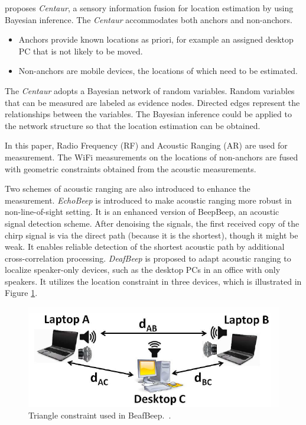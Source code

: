 \documentclass[letterpaper]{article}
\begin{document}
\cite{Nandakumar:2012:CLD:2348543.2348579} proposes \emph{Centaur}, a sensory information fusion for location estimation by using Bayesian inference.
The \emph{Centaur} accommodates both anchors and non-anchors.
\begin{itemize}
\item Anchors provide known locations as priori, for example an assigned desktop PC that is not likely to be moved.
\item Non-anchors are mobile devices, the locations of which need to be estimated.
\end{itemize}

The \emph{Centaur} adopts a Bayesian network of random variables.
Random variables that can be measured are labeled as evidence nodes.
Directed edges represent the relationships between the variables.
The Bayesian inference could be applied to the network structure so that the location estimation can be obtained.

In this paper, Radio Frequency (RF) and Acoustic Ranging (AR) are used for measurement.
The WiFi measurements on the locations of non-anchors are fused with geometric constraints obtained from the acoustic measurements.

Two schemes of acoustic ranging are also introduced to enhance the measurement.
\emph{EchoBeep} is introduced to make acoustic ranging more robust in non-line-of-sight setting.
It is an enhanced version of BeepBeep, an acoustic signal detection scheme.
After denoising the signals, the first received copy of the chirp signal is via the direct path (because it is the shortest), though it might be weak.
It enables reliable detection of the shortest acoustic path by additional cross-correlation processing.
\emph{DeafBeep} is proposed to adapt acoustic ranging to localize speaker-only devices, such as the desktop PCs in an office with only speakers.
It utilizes the location constraint in three devices, which is illustrated in Figure \ref{fig:deafbeep}.
\begin{figure}
	\centering
	\includegraphics[width=0.7\linewidth]{fig/DeafBeep.png}
	\caption{Triangle constraint used in BeafBeep.~\cite{Nandakumar:2012:CLD:2348543.2348579}.}
	\label{fig:deafbeep}
\end{figure}
\end{document}
